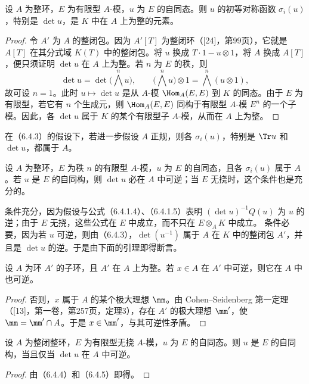 设 $A$ 为整环，$E$ 为有限型 $A$-模，$u$ 为 $E$ 的自同态。则 $u$ 的初等对称函数 $\sigma_i(u)$，特别是 $\det u$，是 $K$ 中在 $A$ 上为整的元素。
\begin{proof}
令 $A'$ 为 $A$ 的整闭包。因为 $A'[T]$ 为整闭环（[24]，第99页），它就是 $A[T]$ 在其分式域 $K(T)$ 中的整闭包。将 $u$ 换成 $T\cdot1-u\otimes1$，将 $A$ 换成 $A[T]$，便只须证明 $\det u$ 在 $A$ 上为整。若 $n$ 为 $E$ 的秩，则
\[
\det u=\det\bigl(\textstyle\bigwedge^n u\bigr),\qquad
\bigl(\textstyle\bigwedge^n u\bigr)\otimes1=\textstyle\bigwedge^n(u\otimes1),
\]
故可设 $n=1$。此时 $u\mapsto\det u$ 是从 $A$-模 $\Hom_A(E,E)$ 到 $K$ 的同态。由于 $E$ 为有限型，若它有 $n$ 个生成元，则 $\Hom_A(E,E)$ 同构于有限型 $A$-模 $E^n$ 的一个子模。因此，各 $\det u$ 属于 $K$ 的某个有限型子 $A$-模，从而在 $A$ 上为整。
\end{proof}

在（6.4.3）的假设下，若进一步假设 $A$ 正规，则各 $\sigma_i(u)$，特别是 $\Tr u$ 和 $\det u$，都属于 $A$。

设 $A$ 为整环，$E$ 为秩 $n$ 的有限型 $A$-模，$u$ 为 $E$ 的自同态，且各 $\sigma_i(u)$ 属于 $A$。若 $u$ 是 $E$ 的自同构，则 $\det u$ 必在 $A$ 中可逆；当 $E$ 无挠时，这个条件也是充分的。

条件充分，因为假设与公式（6.4.1.4）、（6.4.1.5）表明 $(\det u)^{-1}Q(u)$ 为 $u$ 的逆；由于 $E$ 无挠，这些公式在 $E$ 中成立，而不只在 $E\otimes_A K$ 中成立。
条件必要，因为若 $u$ 可逆，则由（6.4.3），$\det(u^{-1})$ 属于 $A$ 在 $K$ 中的整闭包 $A'$，并且是 $\det u$ 的逆。于是由下面的引理即得断言。

设 $A$ 为环 $A'$ 的子环，且 $A'$ 在 $A$ 上为整。若 $x\in A$ 在 $A'$ 中可逆，则它在 $A$ 中也可逆。
\begin{proof}
否则，$x$ 属于 $A$ 的某个极大理想 $\mm$。由 Cohen--Seidenberg 第一定理（[13]，第一卷，第257页，定理3），存在 $A'$ 的极大理想 $\mm'$，使 $\mm=\mm'\cap A$。于是 $x\in\mm'$，与其可逆性矛盾。
\end{proof}

设 $A$ 为整闭整环，$E$ 为有限型无挠 $A$-模，$u$ 为 $E$ 的自同态。则 $u$ 是 $E$ 的自同构，当且仅当 $\det u$ 在 $A$ 中可逆。
\begin{proof}
由（6.4.4）和（6.4.5）即得。
\end{proof}

